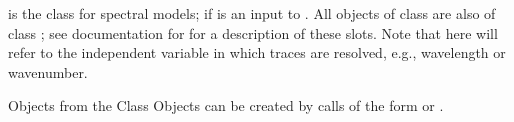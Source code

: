 \documentclass{article}
\begin{document}
\begin{Description}\relax
{} is the class for spectral models; if  
is an 
input to . All objects of class 
 are
also of class ; see documentation for  
for a description of 
these slots.  Note that here  
will refer to the independent variable in
which traces are resolved, e.g., wavelength or wavenumber.
\end{Description}
\begin{Section}{Objects from the Class}
Objects can be created by calls of the form  or 
.
\end{Section}
\end{document}
